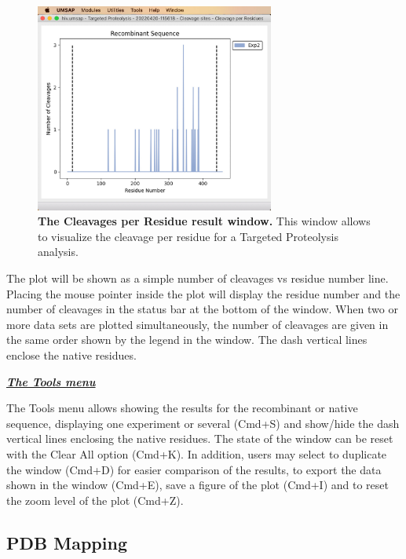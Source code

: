 \begin{figure}[h]
    \centering
    \includegraphics[width=0.7\textwidth]{./IMAGES/MOD-TARPROT/tarprot-cutres.jpg}
    \caption[The Cleavages per Residue result window]{\textbf{The Cleavages per
    Residue result window.} This window allows to visualize the cleavage per residue
    for a Targeted Proteolysis analysis.}
    \label{fig:tarprotCutsRes}
    \vspace{-5pt}
\end{figure}

The plot will be shown as a simple number of cleavages vs residue number line.
Placing the mouse pointer inside the plot will display the residue number and the
number of cleavages in the status bar at the bottom of the window. When two or more
data sets are plotted simultaneously, the number of cleavages are given in the same
order shown by the legend in the window. The dash vertical lines enclose the native
residues. 

\textit{\textbf{\underline{The Tools menu}}}

The Tools menu allows showing the results for the recombinant or native sequence,
displaying one experiment or several (Cmd+S) and show/hide the dash vertical lines
enclosing the native residues. The state of the window can be reset with the Clear All
option (Cmd+K). In addition, users may select to duplicate the window (Cmd+D) for
easier comparison of the results, to export the data shown in the window (Cmd+E),
save a figure of the plot (Cmd+I) and to reset the zoom level of the plot (Cmd+Z).

\subsection{PDB Mapping}
\label{subsec:tarprotPDB}

